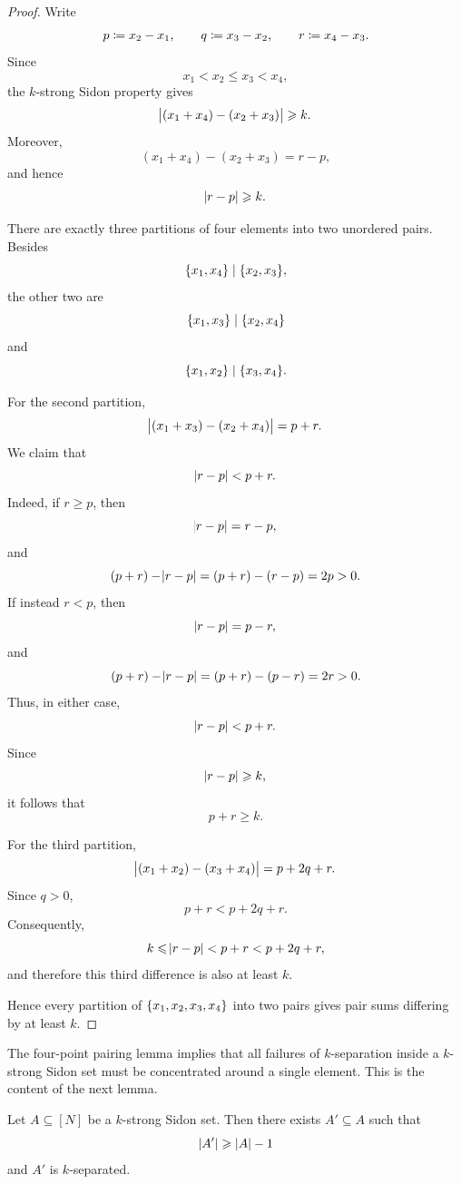 \documentclass[reqno,a4paper,12pt]{amsart}
\begin{document}
\begin{proof}
    Write
    \[
        p\mathrel{\coloneqq} x_2-x_1,
        \qquad
        q\mathrel{\coloneqq} x_3-x_2,
        \qquad
        r\mathrel{\coloneqq} x_4-x_3.
    \]
    Since
    \[
        x_1<x_2\leq x_3<x_4,
    \]
    the \(k\)-strong Sidon property gives
    \[
        \abs{
            (x_1+x_4)-(x_2+x_3)
        }
        \geqslant k.
    \]
    Moreover,
    \[
        (x_1+x_4)-(x_2+x_3)
        =
        r-p,
    \]
    and hence
    \[
        \abs{r-p}\geqslant k.
    \]

    There are exactly three partitions of four elements into two
    unordered pairs. Besides
    \[
        \lbrace x_1,x_4\rbrace
        \mid
        \lbrace x_2,x_3\rbrace,
    \]
    the other two are
    \[
        \lbrace x_1,x_3\rbrace
        \mid
        \lbrace x_2,x_4\rbrace
    \]
    and
    \[
        \lbrace x_1,x_2\rbrace
        \mid
        \lbrace x_3,x_4\rbrace.
    \]

    For the second partition,
    \[
        \abs{
            (x_1+x_3)-(x_2+x_4)
        }
        =
        p+r.
    \]
    We claim that
    \[
        \abs{r-p}<p+r.
    \]
    Indeed, if \(r\geq p\), then
    \[
        \abs{r-p}=r-p,
    \]
    and
    \[
        (p+r)-\abs{r-p}
        =
        (p+r)-(r-p)
        =
        2p
        >
        0.
    \]
    If instead \(r<p\), then
    \[
        \abs{r-p}=p-r,
    \]
    and
    \[
        (p+r)-\abs{r-p}
        =
        (p+r)-(p-r)
        =
        2r
        >
        0.
    \]
    Thus, in either case,
    \[
        \abs{r-p}<p+r.
    \]
    Since
    \[
        \abs{r-p}\geqslant k,
    \]
    it follows that
    \[
        p+r\geq k.
    \]

    For the third partition,
    \[
        \abs{
            (x_1+x_2)-(x_3+x_4)
        }
        =
        p+2q+r.
    \]
    Since \(q>0\),
    \[
        p+r<p+2q+r.
    \]
    Consequently,
    \[
        k
        \leqslant
        \abs{r-p}
        <
        p+r
        <
        p+2q+r,
    \]
    and therefore this third difference is also at least \(k\).

    Hence every partition of
    \(\lbrace x_1,x_2,x_3,x_4\rbrace\) into two pairs gives pair sums differing
    by at least \(k\).
\end{proof}

The four-point pairing lemma implies that all failures of
\(k\)-separation inside a \(k\)-strong Sidon set must be concentrated
around a single element. This is the content of the next lemma.

\begin{lemma}
    \label{lem:k-separated-core}
    Let \(A\subseteq[N]\) be a \(k\)-strong Sidon set. Then there exists
    \(A'\subseteq A\) such that
    \[
        \lvert A'\rvert\geqslant\lvert A\rvert-1
    \]
    and \(A'\) is \(k\)-separated.
\end{lemma}
\end{document}
